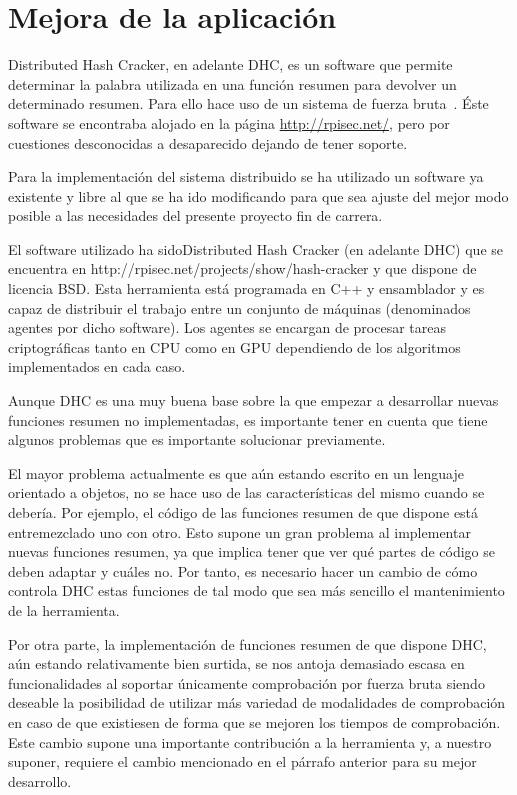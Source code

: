 \chapter{Mejora de la aplicación}\label{cap4}

Distributed Hash Cracker, en adelante DHC, es un software que permite determinar la palabra utilizada en una función resumen para devolver un determinado resumen. Para ello hace uso de un sistema de fuerza bruta~\cite{dhc:paper}. Éste software se encontraba alojado en la página \url{http://rpisec.net/}, pero por cuestiones desconocidas a desaparecido dejando de tener soporte.

Para la implementación del sistema distribuido se ha utilizado un software ya existente y libre al que se ha ido modificando para que sea ajuste del mejor modo posible a las necesidades del presente proyecto fin de carrera.

El software utilizado ha sidoDistributed Hash Cracker (en adelante DHC) que se encuentra en http://rpisec.net/projects/show/hash-cracker y que dispone de licencia BSD. Esta herramienta está programada en C++ y ensamblador y es capaz de distribuir el trabajo entre un conjunto de máquinas (denominados agentes por dicho software). Los agentes se encargan de procesar tareas criptográficas tanto en CPU como en GPU dependiendo de los algoritmos implementados en cada caso.

Aunque DHC es una muy buena base sobre la que empezar a desarrollar nuevas funciones resumen no implementadas, es importante tener en cuenta que tiene algunos problemas que es importante solucionar previamente.

El mayor problema actualmente es que aún estando escrito en un lenguaje orientado a objetos, no se hace uso de las características del mismo cuando se debería. Por ejemplo, el código de las funciones resumen de que dispone está entremezclado uno con otro. Esto supone un gran problema al implementar nuevas funciones resumen, ya que implica tener que ver qué partes de código se deben adaptar y cuáles no. Por tanto, es necesario hacer un cambio de cómo controla DHC estas funciones de tal modo que sea más sencillo el mantenimiento de la herramienta.

Por otra parte, la implementación de funciones resumen de que dispone DHC, aún estando relativamente bien surtida, se nos antoja demasiado escasa en funcionalidades al soportar únicamente comprobación por fuerza bruta siendo deseable la posibilidad de utilizar más variedad de modalidades de comprobación en caso de que existiesen de forma que se mejoren los tiempos de comprobación. Este cambio supone una importante contribución a la herramienta y, a nuestro suponer, requiere el cambio mencionado en el párrafo anterior para su mejor desarrollo.

